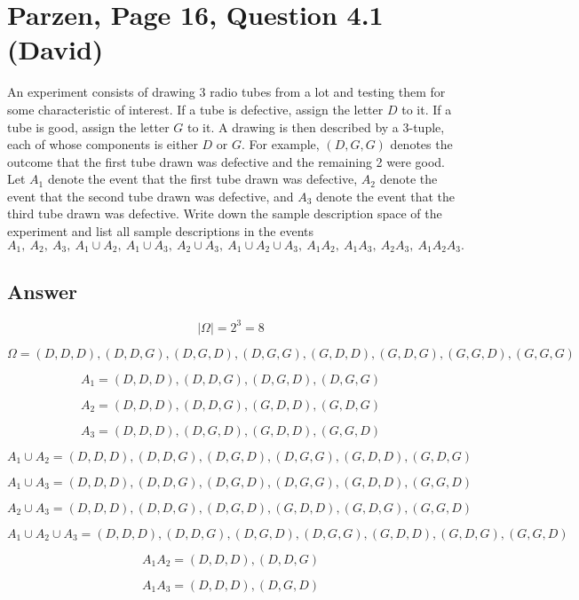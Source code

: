 \documentclass[11pt]{article}
\begin{document}
\section*{Parzen, Page 16, Question 4.1 (David)}

An experiment consists of drawing 3 radio tubes from a lot and testing them for some characteristic 
of interest. 
If a tube is defective, assign the letter \(D\) to it. 
If a tube is good, assign the letter \(G\) to it. 
A drawing is then described by a 3-tuple, each of whose components is either \(D\) or \(G\). 
For example, \((D, G, G)\) denotes the outcome that the first tube drawn was defective and the remaining 2 
were good. 
Let \(A_1\) denote the event that the first tube drawn was defective, 
\(A_2\) denote the event that the second tube drawn was defective, 
and \(A_3\) denote the event that the third tube drawn was defective. 
Write down the sample description space of the experiment and list all sample descriptions in the events
\[
    A_1,\ A_2,\ A_3,\ A_1 \cup A_2,\ A_1 \cup A_3,\
    A_2 \cup A_3,\ A_1 \cup A_2 \cup A_3,\ A_1A_2,\
    A_1A_3,\ A_2A_3,\ A_1A_2A_3.
\]


\subsection*{Answer}

\[
\left|\Omega\right| = 2^3 = 8
\]

\[
\Omega = {(D, D, D), (D, D, G), (D, G, D), (D, G, G),
(G, D, D), (G, D, G), (G, G, D), (G, G, G)
}
\]

\[
A_1 = {(D, D, D), (D, D, G), (D, G, D), (D, G, G)}
\]

\[
A_2 = {(D, D, D), (D, D, G), (G, D, D), (G, D, G) }
\]


\[
A_3 = {(D, D, D),  (D, G, D), (G, D, D), (G, G, D)}
\]


\[
A_1 \cup A_2 = 
{(D, D, D), (D, D, G), (D, G, D), (D, G, G),
(G, D, D), (G, D, G)
}
\]

\[
A_1 \cup A_3 = 
{(D, D, D), (D, D, G), (D, G, D), (D, G, G),
(G, D, D), (G, G, D)
}
\]

\[
A_2 \cup A_3 = 
{(D, D, D), (D, D, G), (D, G, D), 
(G, D, D), (G, D, G), (G, G, D)
}
\]


\[
A_1 \cup A_2 \cup A_3 = 
{(D, D, D), (D, D, G), (D, G, D), (D, G, G),
(G, D, D), (G, D, G), (G, G, D)
}
\]



\[
A_1A_2 = {(D, D, D), (D, D, G)}
\]


\[
A_1A_3 = {(D, D, D),  (D, G, D)}
\]
\end{document}
